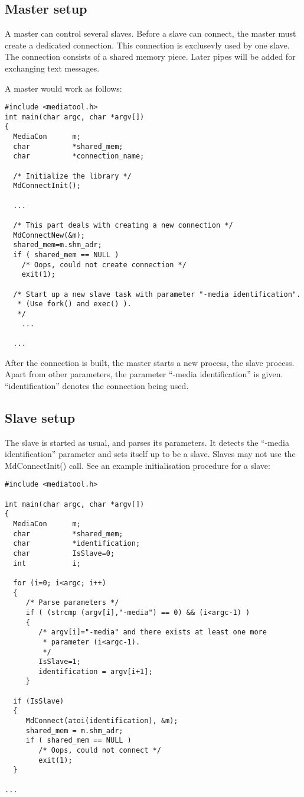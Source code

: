    

\subsection*{Master setup}
A master can control several slaves. Before a slave can connect, the master
must create a dedicated connection. This connection is exclusevly used by one
slave. The connection consists of a shared memory piece. Later pipes will
be added for exchanging text messages.

A master would work as follows:

\begin{verbatim}
#include <mediatool.h>
int main(char argc, char *argv[])
{
  MediaCon      m;
  char          *shared_mem;
  char          *connection_name;

  /* Initialize the library */
  MdConnectInit();

  ...

  /* This part deals with creating a new connection */
  MdConnectNew(&m);
  shared_mem=m.shm_adr;
  if ( shared_mem == NULL )
    /* Oops, could not create connection */
    exit(1);

  /* Start up a new slave task with parameter "-media identification".
   * (Use fork() and exec() ).
   */
    ...

  ...
\end{verbatim}
\medskip

After the connection is built, the master starts a new process, the slave
process. Apart from other parameters, the parameter ``-media identification''
is given. ``identification'' denotes the connection being used.

\subsection*{Slave setup}

The slave is started as usual, and parses its parameters. It detects the
``-media identification'' parameter and sets itself up to be a slave.
Slaves may not use  the
MdConnectInit() call. See an example initialisation procedure for a slave:

\begin{verbatim}
#include <mediatool.h>

int main(char argc, char *argv[])
{
  MediaCon      m;
  char          *shared_mem;
  char          *identification;
  char          IsSlave=0;
  int           i;

  for (i=0; i<argc; i++)
  {
     /* Parse parameters */
     if ( (strcmp (argv[i],"-media") == 0) && (i<argc-1) )
     {
        /* argv[i]="-media" and there exists at least one more
         * parameter (i<argc-1).
         */
        IsSlave=1;
        identification = argv[i+1];
     }

  if (IsSlave)
  {
     MdConnect(atoi(identification), &m);
     shared_mem = m.shm_adr;
     if ( shared_mem == NULL )
        /* Oops, could not connect */
        exit(1);
  }

...
\end{verbatim}
\medskip





